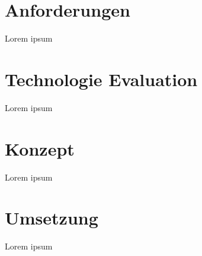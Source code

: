 
\section{Anforderungen}

Lorem ipsum
\clearpage

\section{Technologie Evaluation}

Lorem ipsum
\clearpage

\section{Konzept}

Lorem ipsum
\clearpage

\section{Umsetzung}

Lorem ipsum
\clearpage
